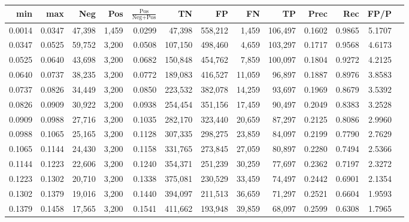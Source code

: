 \begin{tabular}{rrrrrrrrrrrrr}
\toprule
   min &    max &    Neg &   Pos & $\frac{\text{Pos}}{\text{Neg}+\text{Pos}}$ &      TN &      FP &      FN &      TP &   Prec &    Rec &   FP/P \\
\midrule
0.0014 & 0.0347 & 47,398 & 1,459 &                                     0.0299 &  47,398 & 558,212 &   1,459 & 106,497 & 0.1602 & 0.9865 & 5.1707 \\
0.0347 & 0.0525 & 59,752 & 3,200 &                                     0.0508 & 107,150 & 498,460 &   4,659 & 103,297 & 0.1717 & 0.9568 & 4.6173 \\
0.0525 & 0.0640 & 43,698 & 3,200 &                                     0.0682 & 150,848 & 454,762 &   7,859 & 100,097 & 0.1804 & 0.9272 & 4.2125 \\
0.0640 & 0.0737 & 38,235 & 3,200 &                                     0.0772 & 189,083 & 416,527 &  11,059 &  96,897 & 0.1887 & 0.8976 & 3.8583 \\
0.0737 & 0.0826 & 34,449 & 3,200 &                                     0.0850 & 223,532 & 382,078 &  14,259 &  93,697 & 0.1969 & 0.8679 & 3.5392 \\
0.0826 & 0.0909 & 30,922 & 3,200 &                                     0.0938 & 254,454 & 351,156 &  17,459 &  90,497 & 0.2049 & 0.8383 & 3.2528 \\
0.0909 & 0.0988 & 27,716 & 3,200 &                                     0.1035 & 282,170 & 323,440 &  20,659 &  87,297 & 0.2125 & 0.8086 & 2.9960 \\
0.0988 & 0.1065 & 25,165 & 3,200 &                                     0.1128 & 307,335 & 298,275 &  23,859 &  84,097 & 0.2199 & 0.7790 & 2.7629 \\
0.1065 & 0.1144 & 24,430 & 3,200 &                                     0.1158 & 331,765 & 273,845 &  27,059 &  80,897 & 0.2280 & 0.7494 & 2.5366 \\
0.1144 & 0.1223 & 22,606 & 3,200 &                                     0.1240 & 354,371 & 251,239 &  30,259 &  77,697 & 0.2362 & 0.7197 & 2.3272 \\
0.1223 & 0.1302 & 20,710 & 3,200 &                                     0.1338 & 375,081 & 230,529 &  33,459 &  74,497 & 0.2442 & 0.6901 & 2.1354 \\
0.1302 & 0.1379 & 19,016 & 3,200 &                                     0.1440 & 394,097 & 211,513 &  36,659 &  71,297 & 0.2521 & 0.6604 & 1.9593 \\
0.1379 & 0.1458 & 17,565 & 3,200 &                                     0.1541 & 411,662 & 193,948 &  39,859 &  68,097 & 0.2599 & 0.6308 & 1.7965 \\

\end{tabular}
